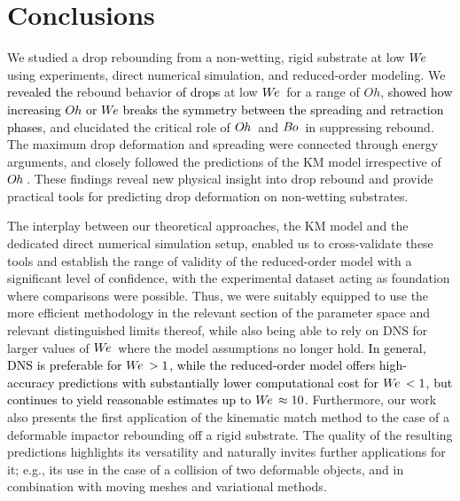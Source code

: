 \documentclass{jfm}
\newcommand{\edit}[1]{\textcolor{black}{#1}}
\newcommand{\We}{W\kern-0.15em e\,}
\newcommand{\Bo}{B\kern-0.05em o\,}
\newcommand{\Oh}{O\kern-0.05em h\,}
\begin{document}
\section{Conclusions} \label{sec:conclusions}

We studied a drop rebounding from a non-wetting, rigid substrate at low $\We$ using experiments, direct numerical simulation, and reduced-order modeling. We \edit{revealed the} rebound behavior \edit{of drops} at low $\We$ for a range of $Oh$, \edit{showed how increasing $Oh$ or $We$ breaks the symmetry between the spreading and retraction phases}, and elucidated the critical role of $\Oh$ and $\Bo$ in suppressing rebound. The maximum drop deformation and spreading were connected through energy arguments, and closely followed the predictions of the KM model irrespective of $\Oh$. These findings reveal new physical insight into drop rebound and provide practical tools for predicting drop deformation on non-wetting substrates.  

The interplay between our theoretical approaches, the KM model and the dedicated direct numerical simulation setup, enabled us to cross-validate these tools and establish the range of validity of the reduced-order model with a significant level of confidence, with the experimental dataset acting as foundation where comparisons were possible. Thus, we were suitably equipped to use the more efficient methodology in the relevant section of the parameter space and relevant distinguished limits thereof, while also being able to rely on DNS for larger values of $\We$ where the model assumptions no longer hold. \edit{In general, DNS is preferable for $\We > 1$, while the reduced-order model offers high-accuracy predictions with substantially lower computational cost for $\We < 1$, but continues to yield reasonable estimates up to $\We \approx 10$.} Furthermore, our work also presents the first application of the kinematic match method to the case of a deformable impactor rebounding off a rigid substrate. The quality of the resulting predictions highlights its versatility and naturally invites further applications for it; e.g., its use in the case of a collision of two deformable objects, and in combination with moving meshes and variational methods. 
\end{document}
